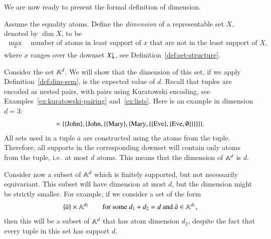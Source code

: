 We are now ready to present the formal definition of dimension.  

\begin{definition}\label{def:dim-sem} Assume the equality atoms. Define the \emph{dimension} of a representable set $X$, denoted by $\dim X$, to be 
 \begin{align*}
 \max_{x}\quad \text{number of atoms in least support of $x$ that are not in the least support of $X$},  
 \end{align*}
 where $x$ ranges over  the downset $X\!\!\downarrow$, see Definition~\ref{def:set-structure}.
\end{definition}

\begin{myexample}
    Consider the set $\mathbb A^d$. We will show that the dimension of this set, if we apply Definition~\ref{def:dim-sem}, is the expected value of $d$.  Recall that tuples are encoded as nested pairs, with pairs using Kuratowski encoding, see Examples~\ref{ex:kuratowski-pairing} and~\ref{ex:lists}. Here is an example in dimension $d=3$:
    \begin{align*}
    [\john,\mary,\eve] = \set{\set{\john},\set{\john,
    \set{
        \set{\mary},
        \set{\mary,
        \set{\set{\eve}, \set{\eve, \emptyset}}
        }
    }
    }}.
    \end{align*}
    All sets used in a tuple $\bar a$ are constructed using the atoms from the tuple. Therefore, all supports in the corresponding downset will contain only atoms from the tuple, i.e.~at most $d$ atoms. This means that  the dimension of $\mathbb A^d$ is $d$. 

    Consider now a  subset  of $\mathbb A^d$ which is finitely supported, but not necessarily equivariant. This subset will have dimension at most $d$, but the dimension might be strictly smaller. For example, if we consider a set of the form 
    \begin{align}\label{eq:atoms-d1-d2}
    \{\bar a\} \times \mathbb A^{d_2} \qquad \text{for some $d_1 + d_2 = d$ and  $\bar a \in \mathbb A^{d_1}$},
    \end{align} 
    then this will be a subset of $\mathbb A^d$ that has atom dimension $d_2$, despite the fact that every tuple in this set has support $d$.  
\end{myexample}



